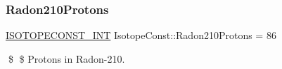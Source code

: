 \subsubsection{\texorpdfstring{Radon210\+Protons}{Radon210Protons}}
{\footnotesize\ttfamily \mbox{\hyperlink{group___isotope_const-_macros_ga5f18360b3e99483a35c32d789e62621c}{I\+S\+O\+T\+O\+P\+E\+C\+O\+N\+S\+T\+\_\+\+I\+NT}} Isotope\+Const\+::\+Radon210\+Protons = 86}

\$ \$ Protons in Radon-\/210. 